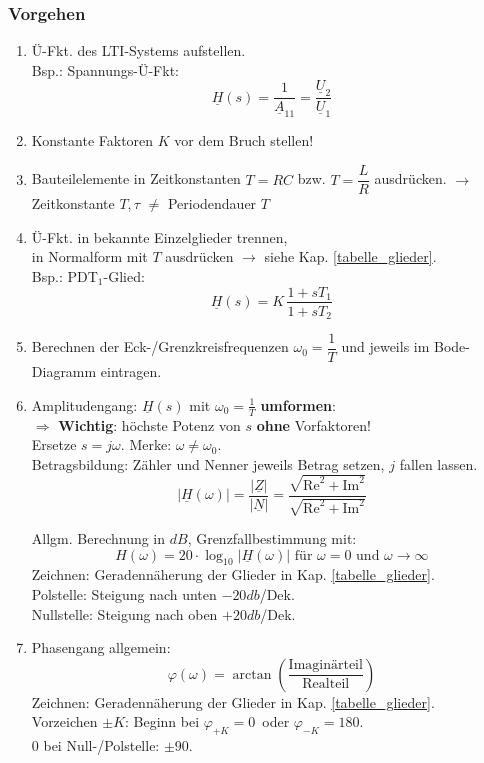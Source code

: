  \subsubsection{Vorgehen}
 \begin{enumerate}
 	\item Ü-Fkt. des LTI-Systems aufstellen.\\
 	Bsp.: Spannungs-Ü-Fkt: $$\underline{H}(s)=\frac{1}{\underline{A}_{11}} = \frac{\underline{U}_2}{\underline{U}_1}$$
 	
 	\item Konstante Faktoren $K$ vor dem Bruch stellen!
 	\item Bauteilelemente in Zeitkonstanten $T=RC$ bzw.  $T=\dfrac{L}{R}$ ausdrücken. {\small $\rightarrow$ Zeitkonstante $T, \tau$ $\neq $ Periodendauer $T$}
 	\item Ü-Fkt. in bekannte Einzelglieder trennen, \\in Normalform mit $T$ ausdrücken $\rightarrow$ siehe Kap. \ref{tabelle_glieder}.\\
 	Bsp.: PDT$_1$-Glied: $$\underline{H}(s)=K\,\frac{1+sT_1}{1+sT_2}$$
 	\item Berechnen der Eck-/Grenzkreisfrequenzen $\omega_0 = \dfrac{1}{T}$ und jeweils im Bode-Diagramm eintragen.
 	\item Amplitudengang:
 	$\underline{H}(s)$ mit $\omega_0=\frac{1}{T}$ \textbf{umformen}:\\ $\Rightarrow$ \textbf{Wichtig}: höchste Potenz von $s$ \textbf{ohne} Vorfaktoren!\\
 	Ersetze $s=j\omega$. \quad Merke:  $\omega\neq\omega_0$.\\
 	
  	Betragsbildung: Zähler und Nenner jeweils Betrag setzen, $j$ fallen lassen.
 	$$ |\underline{H}(\omega)| = \frac{|\underline{Z}|}{|\underline{N}|} = \frac{\sqrt{\text{Re}^2+\text{Im}^2}}{\sqrt{\text{Re}^2+\text{Im}^2}} $$
 	
 	Allgm. Berechnung in $dB$, Grenzfallbestimmung mit: 
 	$$H(\omega) = 20\cdot\log_{10}|\underline{H}(\omega)| \text{ für }\omega=0 \text{ und } \omega \rightarrow \infty $$
 	Zeichnen: Geradennäherung der Glieder in Kap. \ref{tabelle_glieder}.\\
 	
 	Polstelle:  Steigung nach unten $-20db$/Dek.\\
 	Nullstelle: Steigung nach oben $+20db$/Dek.
 	
 	\item Phasengang allgemein:
 	$$\varphi(\omega) = \arctan \left( \frac{\text{Imaginärteil}}{\text{Realteil}} \right)$$
 	Zeichnen: Geradennäherung der Glieder in Kap. \ref{tabelle_glieder}.\\
 	Vorzeichen $\pm K$: Beginn bei $\varphi_{+K}=0$\textdegree \, oder $\varphi_{-K}=180$\textdegree.\\
 	0 bei Null-/Polstelle: $\pm90$\textdegree.\\
 \end{enumerate}
